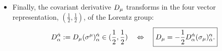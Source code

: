 \begin{itemize}
\begin{equation}
\begin{aligned}
			                    = - \frac{1}{4} \Big(F_{\mathrm{R}}^{\dot{\alpha} \dot{\beta}} \tensor{(\bar{\sigma}_{\mu \nu})}{_{\dot{\alpha} \dot{\beta}}} + F_{\mathrm{L} \alpha \beta} \tensor{(\sigma_{\mu \nu})}{^{\alpha \beta}}\Big) \text{.}
		\end{aligned}
		\label{eq:fieldStrengthTensorsOrdinary}
	\end{equation}
	In both relations, the encountered $ \sigma $-matrices are defined in \cref{eq:sigma2}.
	\item Finally, the covariant derivative $ D_{\mu} $ transforms in the four vector representation, $ (\tfrac{1}{2}, \tfrac{1}{2}) $, of the Lorentz group:
	\begin{equation}
		\begin{aligned}
			\cov_{\alpha}^{\dot{\alpha}} := \cov_{\mu} \tensor*{(\sigma^{\mu})}{_{\alpha} ^{\dot{\alpha}}} \in (\frac{1}{2}, \frac{1}{2})
			\quad \Leftrightarrow \quad
			\boxed{
				\cov_{\mu} = - \frac{1}{2} \cov^{\dot{\alpha}}_{\alpha} \tensor*{(\sigma_{\mu})}{^{\alpha}_{\dot{\alpha}}}.
			}
		\end{aligned}  \label{eq:covDertoSL2C}
	\end{equation}
\end{itemize}
